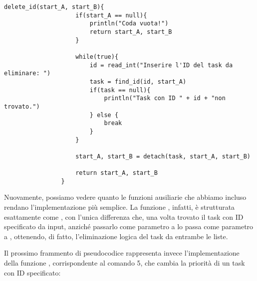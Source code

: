         \begin{center}
            \begin{lstlisting}[language=pseudo, gobble=14]
                delete_id(start_A, start_B){
                    if(start_A == null){
                        println("Coda vuota!")
                        return start_A, start_B
                    }
                    
                    while(true){
                        id = read_int("Inserire l'ID del task da eliminare: ")
                        task = find_id(id, start_A)
                        if(task == null){
                            println("Task con ID " + id + "non trovato.")
                        } else {
                            break
                        }
                    }
                    
                    start_A, start_B = detach(task, start_A, start_B)
                    
                    return start_A, start_B
                }\end{lstlisting}
        \end{center}
        
        Nuovamente, possiamo vedere quanto le funzioni ausiliarie che abbiamo incluso rendano l'implementazione più semplice. La funzione , infatti, è strutturata esattamente come , con l'unica differenza che, una volta trovato il task con ID specificato da input, anziché passarlo come parametro a  lo passa come parametro a , ottenendo, di fatto, l'eliminazione logica del task da entrambe le liste.
        
        Il prossimo frammento di pseudocodice rappresenta invece l'implementazione della funzione , corrispondente al comando 5, che cambia la priorità di un task con ID specificato:
        
